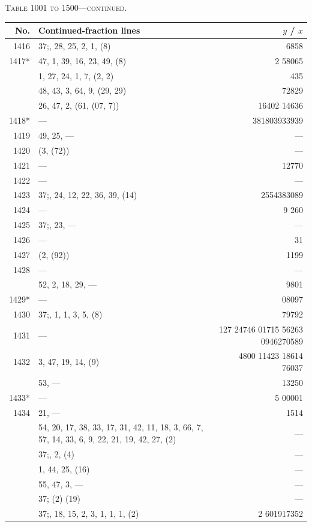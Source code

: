 \documentclass[11pt]{article}
\newcommand{\peheading}{%
  \begin{center}\small\textsc{Table 1001 to 1500---continued.}\end{center}
}
\begin{document}
\peheading
\renewcommand{\arraystretch}{1.15}
{\footnotesize
\begin{longtable}{|r|p{8.5cm}|r|}
\hline
\textbf{No.} & \textbf{Continued-fraction lines} & \textbf{$y$ \;/\; $x$}\\
\hline\endhead
1416   & $37$;\; 1, 28, 25, 2, 1, (8) & 6858 \\
1417*  & 47, 1, 39, 16, 23, 49, (8) & 2 58065 \\
       & 1, 27, 24, 1, 7, (2, 2) & 435 \\
       & 48, 43, 3, 64, 9, (29, 29) & 72829 \\
       & 26, 47, 2, (61, (07, 7)) & 16402 14636 \\
1418*  & --- & 381803933939 \\
1419   & 49, 25, --- & --- \\
1420   & (3, (72)) & --- \\
1421   & --- & 12770 \\
1422   & --- & --- \\
1423   & $37$;\; 50, 24, 12, 22, 36, 39, (14) & 2554383089 \\
1424   & --- & 9 260 \\
1425   & $37$;\; 51, 23, --- & --- \\
1426   & --- & 31 \\
1427   & (2, (92)) & 1199 \\
1428   & --- & --- \\
       & 52, 2, 18, 29, --- & 9801 \\
1429*  & --- & 08097 \\
1430   & $37$;\; 1, 1, 1, 3, 5, (8) & 79792 \\
1431   & --- & 127 24746 01715 56263 0946270589 \\
1432   & 3, 47, 19, 14, (9) & 4800 11423 18614 76037 \\
       & 53, --- & 13250 \\
1433*  & --- & 5 00001 \\
1434   & 21, --- & 1514 \\
       & 54, 20, 17, 38, 33, 17, 31, 42, 11, 18, 3, 66, 7, 57, 14, 33, 6, 9, 22, 21, 19, 42, 27, (2) & --- \\
       & $37$;\; 1, 2, (4) & --- \\
       & 1, 44, 25, (16) & --- \\
\hline
       & 55, 47, 3, --- & --- \\
       & $37$;\; (2) (19) & --- \\
       & $37$;\; 56, 18, 15, 2, 3, 1, 1, 1, (2) & 2 601917352 \\

\end{longtable}}
\end{document}
